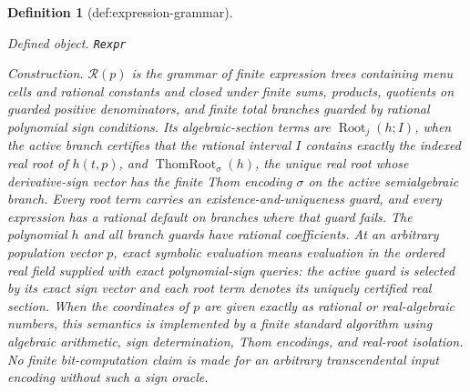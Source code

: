\documentclass{article}
\newtheorem{definition}{Definition}
\begin{document}
\begin{definition}[def:expression-grammar]\label{def:expression-grammar}
\par\smallskip\noindent\emph{Defined object.} \texttt{Rexpr}
\par\smallskip\noindent\emph{Construction.} \(\mathcal R(p)\) is the grammar of finite expression trees containing menu cells and rational constants and closed under finite sums, products, quotients on guarded positive denominators, and finite total branches guarded by rational polynomial sign conditions.  Its algebraic-section terms are \(\operatorname{Root}_j(h;I)\), when the active branch certifies that the rational interval \(I\) contains exactly the indexed real root of \(h(t,p)\), and \(\operatorname{ThomRoot}_{\sigma}(h)\), the unique real root whose derivative-sign vector has the finite Thom encoding \(\sigma\) on the active semialgebraic branch.  Every root term carries an existence-and-uniqueness guard, and every expression has a rational default on branches where that guard fails.  The polynomial \(h\) and all branch guards have rational coefficients.  At an arbitrary population vector \(p\), exact symbolic evaluation means evaluation in the ordered real field supplied with exact polynomial-sign queries: the active guard is selected by its exact sign vector and each root term denotes its uniquely certified real section.  When the coordinates of \(p\) are given exactly as rational or real-algebraic numbers, this semantics is implemented by a finite standard algorithm using algebraic arithmetic, sign determination, Thom encodings, and real-root isolation.  No finite bit-computation claim is made for an arbitrary transcendental input encoding without such a sign oracle.
\end{definition}
\end{document}
